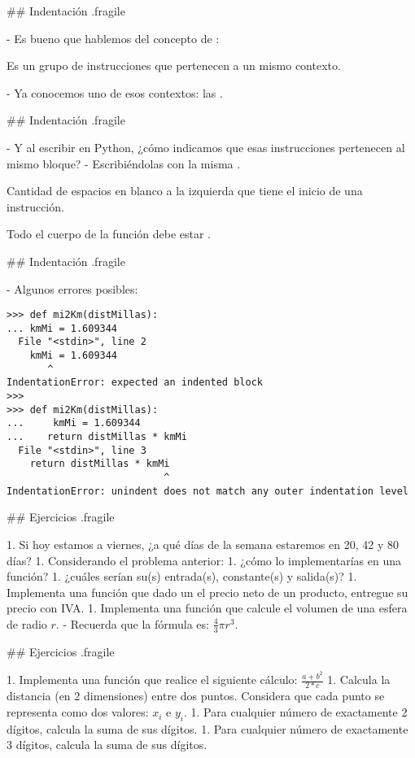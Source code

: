 \trmcolumns
{}

## Indentación {.fragile}

- Es bueno que hablemos del concepto de :

\bgnblockdefinition
{} Es un grupo de instrucciones que pertenecen a un mismo contexto.
\trmblockdefinition

- Ya conocemos uno de esos contextos: las .

## Indentación {.fragile}

- Y al escribir en Python, ¿cómo indicamos que esas instrucciones pertenecen al mismo bloque?
    - Escribiéndolas con la misma .

\pause

\bgnblockdefinition
{} Cantidad de espacios en blanco a la izquierda que tiene el inicio de una instrucción.
\trmblockdefinition

\vspace{2ex}

\pause

\bgnblockidea
Todo el cuerpo de la función debe estar .
\trmblockidea


## Indentación {.fragile}

- Algunos errores posibles:

\begin{lstlisting}
>>> def mi2Km(distMillas):
... kmMi = 1.609344
  File "<stdin>", line 2
    kmMi = 1.609344
       ^
IndentationError: expected an indented block
>>>
>>> def mi2Km(distMillas):
...     kmMi = 1.609344
...    return distMillas * kmMi
  File "<stdin>", line 3
    return distMillas * kmMi
                           ^
IndentationError: unindent does not match any outer indentation level
\end{lstlisting}

## Ejercicios {.fragile}

1. Si hoy estamos a viernes, ¿a qué días de la semana estaremos en 20, 42 y 80 días?
1. Considerando el problema anterior:
    1. ¿cómo lo implementarías en una función?
    1. ¿cuáles serían su(s) entrada(s), constante(s) y salida(s)?
1. Implementa una función que dado un el precio neto de un producto, entregue su precio con IVA.
1. Implementa una función que calcule el volumen de una esfera de radio $r$.
    - Recuerda que la fórmula es: $\frac{4}{3}\pi r^3$.

## Ejercicios {.fragile}

1. Implementa una función que realice el siguiente cálculo: $\frac{a+b^2}{2*c}$
1. Calcula la distancia (en 2 dimensiones) entre dos puntos. Considera que cada punto se representa
como dos valores: $x_i$ e $y_i$.
1. Para cualquier número de exactamente 2 dígitos, calcula la suma de sus dígitos.
1. Para cualquier número de exactamente 3 dígitos, calcula la suma de sus dígitos.
